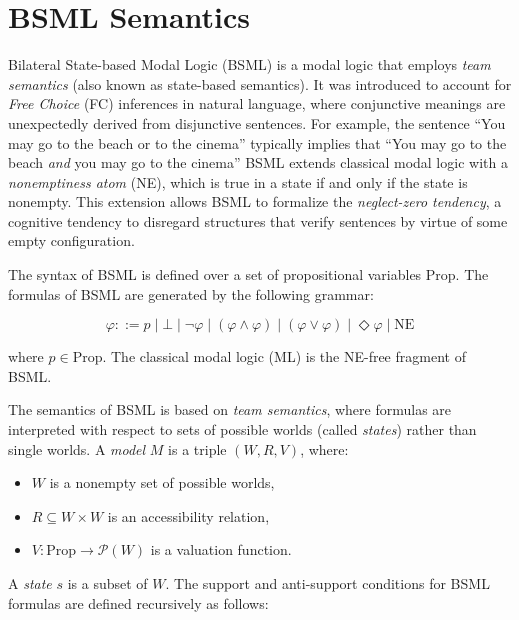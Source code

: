 \section{BSML Semantics}\label{BSML Semantics}

Bilateral State-based Modal Logic (BSML) is a modal logic that employs \textit{team semantics} (also known as state-based semantics). It was introduced to account for \textit{Free Choice} (FC) inferences in natural language, where conjunctive meanings are unexpectedly derived from disjunctive sentences. For example, the sentence ``You may go to the beach or to the cinema'' typically implies that ``You may go to the beach \textit{and} you may go to the cinema'' BSML extends classical modal logic with a \textit{nonemptiness atom} (NE), which is true in a state if and only if the state is nonempty. This extension allows BSML to formalize the \textit{neglect-zero tendency}, a cognitive tendency to disregard structures that verify sentences by virtue of some empty configuration.





The syntax of BSML is defined over a set of propositional variables \(\text{Prop}\). The formulas of BSML are generated by the following grammar:

\[
\varphi ::= p \mid \bot \mid \neg \varphi \mid (\varphi \land \varphi) \mid (\varphi \lor \varphi) \mid \Diamond \varphi \mid \text{NE}
\]

where \(p \in \text{Prop}\). The classical modal logic (ML) is the NE-free fragment of BSML.\@

The semantics of BSML is based on \textit{team semantics}, where formulas are interpreted with respect to sets of possible worlds (called \textit{states}) rather than single worlds. A \textit{model} \(M\) is a triple \((W, R, V)\), where:
\begin{itemize}
    \item \(W\) is a nonempty set of possible worlds,
    \item \(R \subseteq W \times W\) is an accessibility relation,
    \item \(V: \text{Prop} \to \mathcal{P}(W)\) is a valuation function.
\end{itemize}

A \textit{state} \(s\) is a subset of \(W\). The support and anti-support conditions for BSML formulas are defined recursively as follows:

